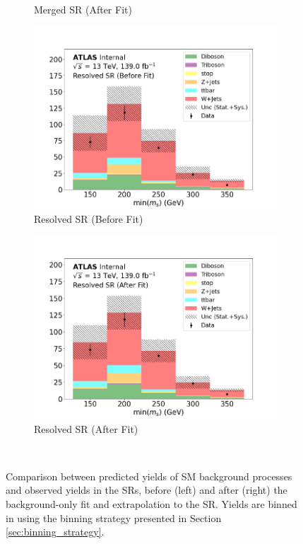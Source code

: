 \begin{figure}[h]
\begin{subfigure}{0.45\textwidth}
    \caption{Merged SR (After Fit)}\label{fig:after_SR_merged}
  \end{subfigure} \vspace{1em}
  \begin{subfigure}{0.45\textwidth}
    \includegraphics[width=\textwidth]{Figures/8/SR_Resolved_before.pdf}
    \caption{Resolved SR (Before Fit)}\label{fig:before_SR_resolved}
  \end{subfigure} \hspace{1em}
  \begin{subfigure}{0.45\textwidth}
    \includegraphics[width=\textwidth]{Figures/8/SR_Resolved_after.pdf}
    \caption{Resolved SR (After Fit)}\label{fig:after_SR_resolved}
  \end{subfigure} \\ \vspace{1em}
  \caption[]{Comparison between predicted yields of SM background processes and observed yields in the SRs, before (left) and after (right) the background-only fit and extrapolation to the SR. Yields are binned in \minms using the binning strategy presented in Section \ref{sec:binning_strategy}.}
  \label{fig:before_after_SRs}
\end{figure}

